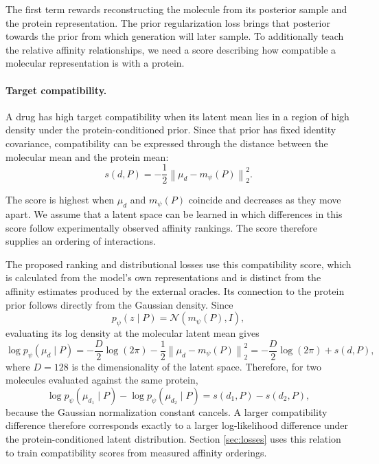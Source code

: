 \documentclass[a4paper,12pt]{article}
\newcommand{\Ncal}{\mathcal{N}}
\begin{document}
The first term rewards reconstructing the molecule from its posterior sample and the protein representation. The prior regularization loss brings that posterior towards the prior from which generation will later sample. To additionally teach the relative affinity relationships, we need a score describing how compatible a molecular representation is with a protein.

\paragraph{Target compatibility.}

A drug has high target compatibility when its latent mean lies in a region of high density under the protein-conditioned prior. Since that prior has fixed identity covariance, compatibility can be expressed through the distance between the molecular mean and the protein mean:
\begin{equation*}
    s(d,P)
    =
    -\frac{1}{2}
    \left\|
    \mu_d-m_\psi(P)
    \right\|_2^2.
\end{equation*}

The score is highest when $\mu_d$ and $m_\psi(P)$ coincide and decreases as they move apart. We assume that a latent space can be learned in which differences in this score follow experimentally observed affinity rankings. The score therefore supplies an ordering of interactions.

The proposed ranking and distributional losses use this compatibility score, which is calculated from the model's own representations and is distinct from the affinity estimates produced by the external oracles. Its connection to the protein prior follows directly from the Gaussian density. Since
\begin{equation*}
    p_\psi(z\mid P)
    =
    \Ncal\!\left(
    m_\psi(P),I
    \right),
\end{equation*}
evaluating its log density at the molecular latent mean gives
\begin{equation*}
    \log p_\psi(\mu_d\mid P)
    =
    -\frac{D}{2}\log(2\pi)
    -
    \frac{1}{2}
    \left\|
    \mu_d-m_\psi(P)
    \right\|_2^2
    =
    -\frac{D}{2}\log(2\pi)
    +
    s(d,P),
\end{equation*}
where $D=128$ is the dimensionality of the latent space. Therefore, for two molecules evaluated against the same protein,
\begin{equation*}
    \log p_\psi(\mu_{d_1}\mid P)
    -
    \log p_\psi(\mu_{d_2}\mid P)
    =
    s(d_1,P)
    -
    s(d_2,P),
\end{equation*}
because the Gaussian normalization constant cancels. A larger compatibility difference therefore corresponds exactly to a larger log-likelihood difference under the protein-conditioned latent distribution. Section \ref{sec:losses} uses this relation to train compatibility scores from measured affinity orderings.
\end{document}
